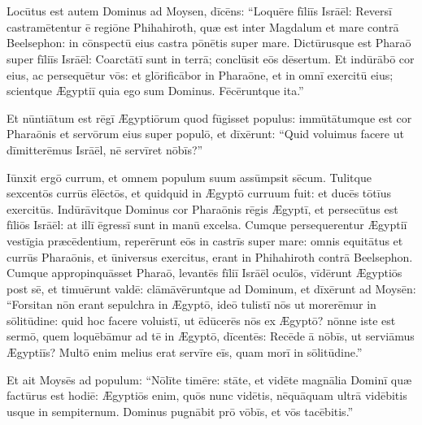 \chapter{}


\thispagestyle{empty}

Locūtus est autem Dominus ad Moysen, dīcēns: ``Loquēre
fīliīs Isrāēl: Reversī castramētentur ē regiōne Phihahiroth, quæ est inter Magdalum et mare
contrā Beelsephon: in cōnspectū eius castra pōnētis super mare.
Dictūrusque est Pharaō super fīliīs Isrāēl:
Coarctātī sunt in terrā;
conclūsit eōs
dēsertum. Et indūrābō cor eius, ac
persequētur vōs: et glōrificābor in
Pharaōne, et in omnī exercitū eius; scientque Ægyptiī quia
ego sum Dominus. Fēcēruntque ita.''

Et nūntiātum est rēgī Ægyptiōrum quod
fūgisset populus: immūtātumque est cor
Pharaōnis et servōrum eius super populō, et dīxērunt: ``Quid
voluimus facere ut dīmitterēmus Isrāēl, nē servīret nōbīs?''

Iūnxit ergō
currum, et omnem populum suum assūmpsit sēcum. Tulitque sexcentōs currūs
ēlēctōs, et quidquid in Ægyptō curruum fuit: et ducēs tōtīus exercitūs.
Indūrāvitque Dominus cor Pharaōnis rēgis Ægyptī, et persecūtus est fīliōs
Isrāēl: at illī ēgressī sunt in manū excelsa.
Cumque persequerentur Ægyptiī vestīgia præcēdentium, reperērunt eōs in castrīs super mare: omnis equitātus et
currūs Pharaōnis, et ūniversus exercitus, erant in Phihahiroth contrā
Beelsephon. Cumque appropinquāsset Pharaō, levantēs fīliī Isrāēl oculōs,
vīdērunt Ægyptiōs post sē, et timuērunt valdē: clāmāvēruntque ad Dominum,
et dīxērunt ad Moysēn: ``Forsitan nōn erant sepulchra in
Ægyptō, ideō tulistī nōs ut morerēmur in sōlitūdine: quid hoc facere voluistī, ut ēdūcerēs
nōs ex Ægyptō? nōnne iste est sermō, quem loquēbāmur ad tē in Ægyptō,
dīcentēs: Recēde ā nōbīs, ut serviāmus Ægyptiīs? Multō enim melius erat
servīre eīs, quam morī in sōlitūdine.''

Et ait Moysēs ad
populum: ``Nōlīte timēre: stāte, et vidēte magnālia Dominī
quæ factūrus est hodiē: Ægyptiōs enim, quōs nunc vidētis,
nēquāquam ultrā vidēbitis usque in
sempiternum. Dominus pugnābit prō vōbīs, et
vōs tacēbitis.''

